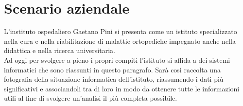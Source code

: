 \newpage

\section{Scenario aziendale} \label{ref:scenario}
	L'instituto ospedaliero Gaetano Pini si presenta come un istituto specializzato nella cura e nella riabilitazione di malattie ortopediche impegnato anche nella didattica e nella ricerca universitaria. \\Ad oggi per svolgere a pieno i propri compiti l'istituto si affida a dei sistemi informatici che sono riassunti in questo paragrafo.
	Sarà così raccolta una fotografia della situazione informatica dell'istituto, riassumendo i dati più significativi e associandoli tra di loro in modo da ottenere tutte le informazioni utili al fine di svolgere un'analisi il più completa possibile.
	

